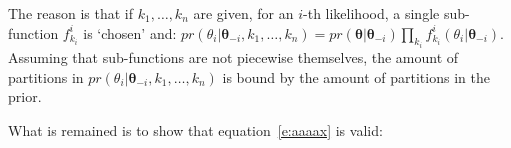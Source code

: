 The reason is that if  $k_1, \ldots, k_n$ are given, for an $i$-th likelihood, a single sub-function $f^i_{k_i}$ is `chosen' and:
$pr(\theta_i | \boldsymbol\theta_{-i}, k_1, \ldots, k_n) = 
pr(\boldsymbol\theta | \boldsymbol\theta_{-i})\prod_{k_i} f^i_{k_i}(\theta_i | \boldsymbol\theta_{-i})$.
Assuming that sub-functions are not piecewise themselves, 
the amount  of partitions in $pr(\theta_i | \boldsymbol\theta_{-i},  k_1, \ldots, k_n)$ is bound by the amount of partitions in the prior.

What is remained is to show that equation~\ref{e:aaaax} is valid:

